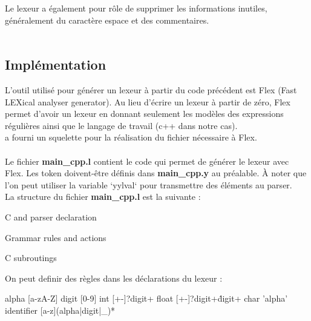 \documentclass[a4paper]{article}
\begin{document}
Le lexeur a également pour rôle de supprimer les informations inutiles, généralement du caractère espace et des commentaires.\\~\\


\subsection{Implémentation}

L'outil utilisé pour générer un lexeur à partir du code précédent est Flex (Fast LEXical analyser generator). Au lieu d'écrire un lexeur à partir de zéro, Flex permet d'avoir un lexeur en donnant seulement les modèles des expressions régulières ainsi que le langage de travail (c++ dans notre cas).\\
\cite{compilerFlexBison} a fourni un squelette pour la réalisation du fichier nécessaire à Flex.\\~\\
\noindent
Le fichier \textbf{main\_cpp.l} contient le code qui permet de générer le lexeur avec Flex. Les token doivent-être définis dans \textbf{main\_cpp.y} au préalable.
À noter que l'on peut utiliser la variable `yylval` pour transmettre des
éléments au parser.\\

La structure du fichier \textbf{main\_cpp.l} est la suivante :

\begin{code}
C and parser declaration

Grammar rules and actions

C subroutings
\end{code}\leavevmode\newline


\noindent
On peut definir des règles dans les déclarations du lexeur :

\begin{code}

alpha [a-zA-Z]
digit [0-9]
int [+-]?{digit}+
float [+-]?{digit}+\.{digit}+
char '{alpha}'
identifier [a-z]({alpha}|{digit}|_)*
\end{code}\leavevmode\newline
\end{document}
